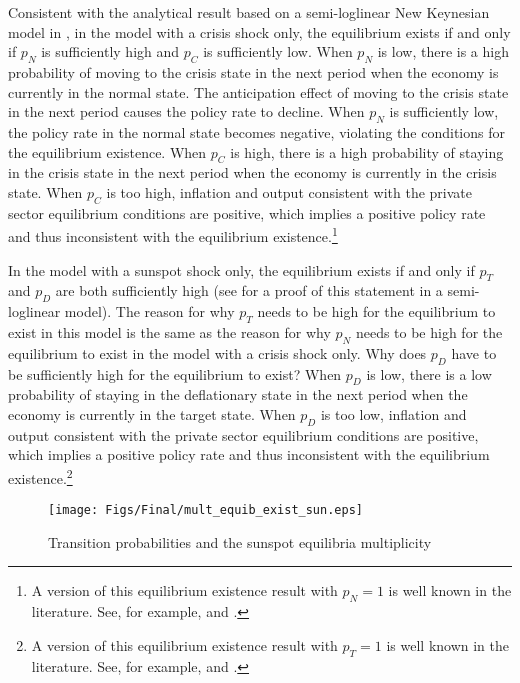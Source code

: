 \documentclass[11pt]{article}
\begin{document}
\begin{singlespace}
		Consistent with the analytical result based on a semi-loglinear New Keynesian model in \citet{NakataSchmidtForthcomingJME}, in the model with a crisis shock only, the equilibrium exists if and only if $p_{N}$ is sufficiently high and $p_{C}$ is sufficiently low. When $p_{N}$ is low, there is a high probability of moving to the crisis state in the next period when the economy is currently in the normal state. The anticipation effect of moving to the crisis state in the next period causes the policy rate to decline. When $p_{N}$ is sufficiently low, the policy rate in the normal state becomes negative, violating the conditions for the equilibrium existence. When $p_{C}$ is high, there is a high probability of staying in the crisis state in the next period when the economy is currently in the crisis state. When $p_{C}$ is too high, inflation and output consistent with the private sector equilibrium conditions are positive, which implies a positive policy rate and thus inconsistent with the equilibrium existence.\footnote{A version of this equilibrium existence result with $p_{N}=1$ is well known in the literature. See, for example, \citet{Eggertsson2011} and \citet{BonevaBraunWaki2016}.} 
		
		In the model with a sunspot shock only, the equilibrium exists if and only if $p_{T}$ and $p_{D}$ are both sufficiently high (see \citet{NakataSchmidt2019} for a proof of this statement in a semi-loglinear model). The reason for why $p_{T}$ needs to be high for the equilibrium to exist in this model is the same as the reason for why $p_{N}$ needs to be high for the equilibrium to exist in the model with a crisis shock only. Why does $p_{D}$ have to be sufficiently high for the equilibrium to exist? When $p_{D}$ is low, there is a low probability of staying in the deflationary state in the next period when the economy is currently in the target state. When $p_{D}$ is too low, inflation and output consistent with the private sector equilibrium conditions are positive, which implies a positive policy rate and thus inconsistent with the equilibrium existence.\footnote{A version of this equilibrium existence result with $p_{T}=1$ is well known in the literature. See, for example, \citet{MertensRavn2014} and \citet{BonevaBraunWaki2016}.}
	
	    \begin{figure}[!ht]
			\begin{center}
				\caption{Transition probabilities and the sunspot equilibria multiplicity\label{fig:ExistenceMultiplicity}}
	        	\vspace{-1em}
	        	\texttt{[image: Figs/Final/mult\_equib\_exist\_sun.eps]}\\
			\end{center}
	        \vspace{-1em}
		\end{figure}
	

\end{singlespace}
\end{document}
